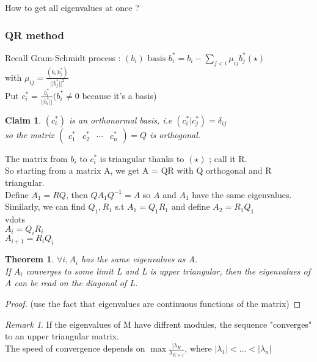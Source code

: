 \documentclass{article}
\newtheorem{claim}{Claim}
\newtheorem{theorem}{Theorem}
\theoremstyle{definition}
\theoremstyle{remark}
\newtheorem*{remark}{Remark}
\begin{document}
How to get all eigenvalues at once ?
\subsubsection{QR method}
Recall Gram-Schmidt process :
$(b_i) \text{ basis } b_i^* = b_i - \sum\limits_{j < i}\mu_{ij}b_j^* (\star)$\\
with $\mu_{ij} = \frac{(b_i|b_j^*)}{||b_j^*||^2}$\\
Put $c_i^* = \frac{b_i^*}{||b_i^*||} (b_i^* \neq 0$ because it's a basis)

\begin{claim}
	$(c_i^*)$ is an orthonormal basis, i.e $(c_i^*|c_j^*) = \delta_{ij}$\\
	so the matrix $\begin{pmatrix}
		c_1^*&c_2^*&\cdots&c_n^*
	\end{pmatrix} = Q$ is orthogonal.
\end{claim}
The matrix from $b_i$ to $c_i^*$ is triangular thanks to $(\star)$ ; call it R.\\
So starting from a matrix A, we get A = QR with Q orthogonal and R triangular.\\

Define $A_1 = RQ$, then $QA_1Q^{-1} = A$ so $A$ and $A_1$ have the same eigenvalues.\\
Similarly, we can find $Q_1,R_1$ s.t $A_1 = Q_1 R_1$ and define $A_2 = R_1 Q_1$\\
vdots\\
$A_i = Q_i R_i$\\
$A_{i+1} = R_i Q_i$\\

\begin{theorem}
	$\forall i, A_i$ has the same eigenvalues as A.\\
	If $A_i$ converges to some limit L and L is upper triangular, then the eigenvalues of A can be read on the diagonal of L.
\end{theorem}

\begin{proof}
	(use the fact that eigenvalues are continuous functions of the matrix)
\end{proof}

\begin{remark}
	If the eigenvalues of M have diffrent modules, the sequence "converges" to an upper triangular matrix.\\
	The speed of convergence depends on $\max \frac{|\lambda_K}{\lambda_{K+1}}$, where $|\lambda_1| < \dots < |\lambda_n|$
\end{remark}
\end{document}
